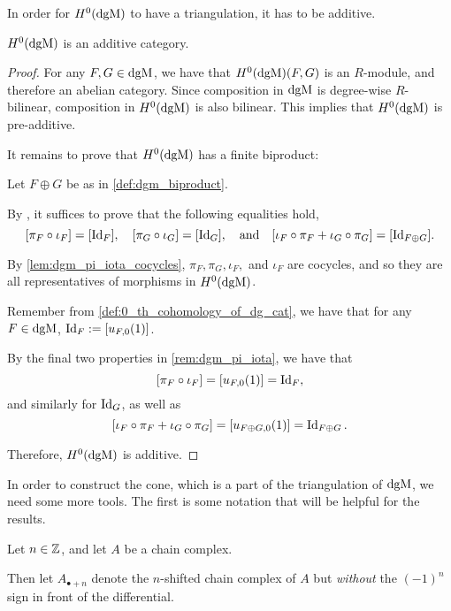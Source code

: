 In order for \( H^0(\operatorname{dgM}) \) to have a triangulation, it has to be additive.

\begin{lemma}
    \( H^0(\operatorname{dgM}) \) is an additive category.
\end{lemma}
\begin{proof}
    For any \( F, G \in \operatorname{dgM} \), we have that \( H^0(\operatorname{dgM})(F, G) \) is an \( R \)-module, and therefore an abelian category. Since composition in \( \operatorname{dgM} \) is degree-wise \( R \)-bilinear, composition in \( H^0(\operatorname{dgM}) \) is also bilinear. This implies that \( H^0(\operatorname{dgM}) \) is pre-additive.

    It remains to prove that \( H^0(\operatorname{dgM}) \) has a finite biproduct:

    Let \( F \oplus G \) be as in \autoref{def:dgm_biproduct}.
    
    By \cite[p.\ 250]{Mac_Lane_1995}, it suffices to prove that the following equalities hold,
    \[
        [\pi_F \circ \iota_F] = [\operatorname{Id}_F], \quad [\pi_G \circ \iota_G] = [\operatorname{Id}_G], \quad \text{and} \quad [\iota_F \circ \pi_F + \iota_G \circ \pi_G] = [\operatorname{Id}_{F \oplus G}].
    \]

    By \autoref{lem:dgm_pi_iota_cocycles}, \( \pi_F, \pi_G, \iota_F, \) and \( \iota_F \) are cocycles, and so they are all representatives of morphisms in \( H^0(\operatorname{dgM}) \).

    Remember from \autoref{def:0_th_cohomology_of_dg_cat}, we have that for any \( F \in \operatorname{dgM} \), \( \operatorname{Id}_F := [u_{F, 0} ( 1 )] \).

    By the final two properties in \autoref{rem:dgm_pi_iota}, we have that
    \[
        [\pi_F \circ \iota_F] = [u_{F, 0} (1)] = \operatorname{Id}_F,
    \]
    and similarly for \( \operatorname{Id}_G \), as well as
    \[
        [\iota_F \circ \pi_F + \iota_G \circ \pi_G] = [u_{F \oplus G, 0} (1)] = \operatorname{Id}_{F \oplus G}.
    \]

    Therefore, \( H^0(\operatorname{dgM}) \) is additive.
\end{proof}

In order to construct the cone, which is a part of the triangulation of \( \operatorname{dgM} \), we need some more tools. The first is some notation that will be helpful for the results.

\begin{notation}
    Let \( n \in {\mathbb{Z}} \), and let \( A \) be a chain complex.
    
    Then let \( A_{\bullet+n} \) denote the \( n \)-shifted chain complex of \( A \) but \emph{without} the \( (-1)^n \) sign in front of the differential.
\end{notation}


